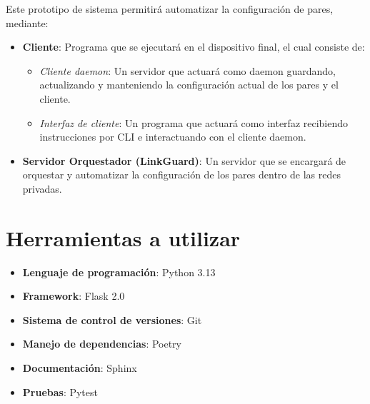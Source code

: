 Este prototipo de sistema permitirá automatizar la configuración de pares, mediante:
\begin{itemize}
    \item \textbf{Cliente}: Programa que se ejecutará en el dispositivo final, el cual consiste de:
    \begin{itemize}
        \item \textit{Cliente daemon}: Un servidor que actuará como daemon guardando, actualizando y manteniendo la configuración actual de los pares y el cliente.
        \item \textit{Interfaz de cliente}: Un programa que actuará como interfaz recibiendo instrucciones por CLI e interactuando con el cliente daemon.
    \end{itemize}
    \item \textbf{Servidor Orquestador (LinkGuard)}: Un servidor que se encargará de orquestar y automatizar la configuración de los pares dentro de las redes privadas.
\end{itemize}


\section{Herramientas a utilizar}
\begin{itemize}
    \item \textbf{Lenguaje de programación}: Python 3.13
    \item \textbf{Framework}: Flask 2.0
    \item \textbf{Sistema de control de versiones}: Git
    \item \textbf{Manejo de dependencias}: Poetry
    \item \textbf{Documentación}: Sphinx
    \item \textbf{Pruebas}: Pytest
\end{itemize}